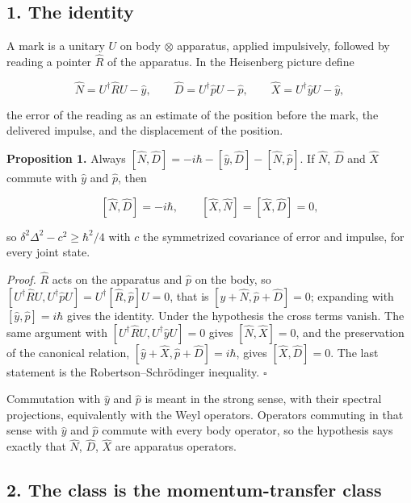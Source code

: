 \documentclass[11pt,a4paper]{article}
\begin{document}
\hypertarget{the-identity}{%
\subsection{1. The identity}\label{the-identity}}

A mark is a unitary \(U\) on body \(\otimes\) apparatus, applied
impulsively, followed by reading a pointer \(\hat R\) of the apparatus.
In the Heisenberg picture define

\[\hat N=U^\dagger\hat RU-\hat y,\qquad \hat D=U^\dagger\hat pU-\hat p,\qquad
\hat X=U^\dagger\hat yU-\hat y,\]

the error of the reading as an estimate of the position before the mark,
the delivered impulse, and the displacement of the position.

\textbf{Proposition 1.} Always
\([\hat N,\hat D]=-i\hbar-[\hat y,\hat D]-[\hat N,\hat p]\). If
\(\hat N\), \(\hat D\) and \(\hat X\) commute with \(\hat y\) and
\(\hat p\), then

\[[\hat N,\hat D]=-i\hbar,\qquad[\hat X,\hat N]=[\hat X,\hat D]=0,\]

so \(\delta^2\Delta^2-c^2\ge\hbar^2/4\) with \(c\) the symmetrized
covariance of error and impulse, for every joint state.

\emph{Proof.} \(\hat R\) acts on the apparatus and \(\hat p\) on the
body, so
\([U^\dagger\hat RU,U^\dagger\hat pU]=U^\dagger[\hat R,\hat p]U=0\),
that is \([\hat y+\hat N,\hat p+\hat D]=0\); expanding with
\([\hat y,\hat p]=i\hbar\) gives the identity. Under the hypothesis the
cross terms vanish. The same argument with
\([U^\dagger\hat RU,U^\dagger\hat yU]=0\) gives \([\hat N,\hat X]=0\),
and the preservation of the canonical relation,
\([\hat y+\hat X,\hat p+\hat D]=i\hbar\), gives \([\hat X,\hat D]=0\).
The last statement is the Robertson--Schrödinger inequality. \(\square\)

Commutation with \(\hat y\) and \(\hat p\) is meant in the strong sense,
with their spectral projections, equivalently with the Weyl operators.
Operators commuting in that sense with \(\hat y\) and \(\hat p\) commute
with every body operator, so the hypothesis says exactly that
\(\hat N\), \(\hat D\), \(\hat X\) are apparatus operators.

\hypertarget{the-class-is-the-momentum-transfer-class}{%
\subsection{2. The class is the momentum-transfer
class}\label{the-class-is-the-momentum-transfer-class}}
\end{document}
